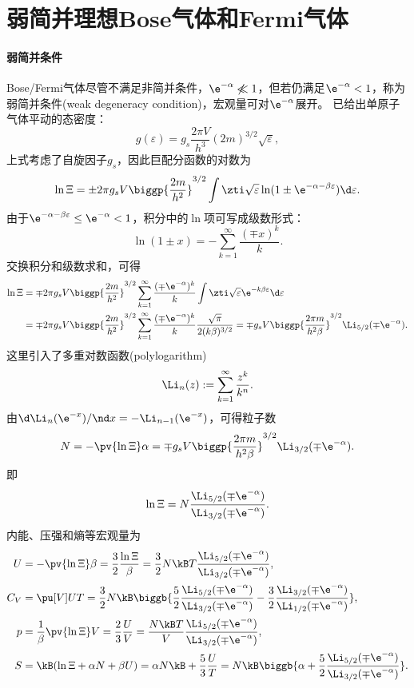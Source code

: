 \section{弱简并理想Bose气体和Fermi气体}
\label{sec:weak degeneracy}

\paragraph{弱简并条件}

Bose/Fermi气体尽管不满足非简并条件，$\e^{-\alpha}\not\ll 1$，但若仍满足$\e^{-\alpha}<1$，称为弱简并条件(weak degeneracy condition)，宏观量可对$\e^{-\alpha}$展开。
 已给出单原子气体平动的态密度：
\[
	g(\varepsilon)=g_s\frac{2\pi V}{h^3}(2m)^{3/2}\sqrt\varepsilon,
\]
上式考虑了自旋因子$g_s$，因此巨配分函数的对数为
\[
	\ln\Xi=\pm 2\pi g_sV\biggp{\frac{2m}{h^2}}^{3/2}\int\zti\sqrt\varepsilon\ln(1\pm\e^{-\alpha-\beta\varepsilon})\d\varepsilon.
\]
由于$\e^{-\alpha-\beta\varepsilon}\leq\e^{-\alpha}<1$，积分中的$\ln$项可写成级数形式：
\[
	\ln(1\pm x)=-\sum_{k=1}^\infty\frac{(\mp x)^k}k.
\]
交换积分和级数求和，可得
\begin{align*}
	\ln\Xi
	&=\mp 2\pi g_sV\biggp{\frac{2m}{h^2}}^{3/2}\sum_{k=1}^\infty\frac{(\mp\e^{-\alpha})^k}{k}\int\zti\sqrt\varepsilon\e^{-k\beta\varepsilon}\d\varepsilon\\
	&=\mp 2\pi g_sV\biggp{\frac{2m}{h^2}}^{3/2}\sum_{k=1}^\infty\frac{(\mp\e^{-\alpha})^k}{k}\frac{\sqrt\pi}{2(k\beta)^{3/2}}
	=\mp g_sV\biggp{\frac{2\pi m}{h^2\beta}}^{3/2}\Li_{5/2}(\mp\e^{-\alpha}).
\end{align*}
这里引入了多重对数函数(polylogarithm)
\begin{equation}
	\Li_n(z):=\sum_{k=1}^\infty\frac{z^k}{k^n}.
\end{equation}
由$\d\Li_n(\e^{-x})/\nd x=-\Li_{n-1}(\e^{-x})$，可得粒子数
\[
	N=-\pv{\ln\Xi}\alpha=\mp g_sV\biggp{\frac{2\pi m}{h^2\beta}}^{3/2}\Li_{3/2}(\mp\e^{-\alpha}).
\]
即
\[
	\ln\Xi=N\frac{\Li_{5/2}(\mp\e^{-\alpha})}{\Li_{3/2}(\mp\e^{-\alpha})}.
\]
内能、压强和熵等宏观量为
\begin{subequations}
	\begin{align}
		U&=-\pv{\ln\Xi}\beta=\frac32\frac{\ln\Xi}\beta=\frac32N\kB T\frac{\Li_{5/2}(\mp\e^{-\alpha})}{\Li_{3/2}(\mp\e^{-\alpha})},\\
		C_V&=\pu[V]UT=\frac32N\kB\biggb{\frac{5}2\frac{\Li_{5/2}(\mp\e^{-\alpha})}{\Li_{3/2}(\mp\e^{-\alpha})}-\frac32\frac{\Li_{3/2}(\mp\e^{-\alpha})}{\Li_{1/2}(\mp\e^{-\alpha})}},\\
		p&=\frac1\beta\pv{\ln\Xi}V=\frac23\frac UV=\frac{N\kB T}V\frac{\Li_{5/2}(\mp\e^{-\alpha})}{\Li_{3/2}(\mp\e^{-\alpha})},\\
		S&=\kB(\ln\Xi+\alpha N+\beta U)=\alpha N\kB+\frac53\frac UT=N\kB\biggb{\alpha+\frac52\frac{\Li_{5/2}(\mp\e^{-\alpha})}{\Li_{3/2}(\mp\e^{-\alpha})}}.
	\end{align}
\end{subequations}
